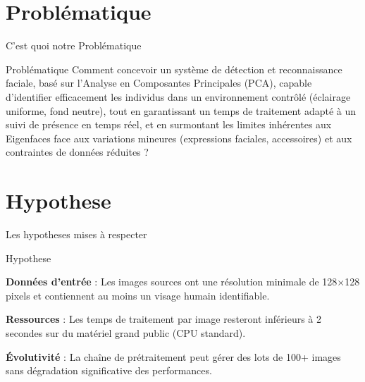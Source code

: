 \documentclass{beamer}
\begin{document}
\section{Problématique}
\begin{frame}{C'est quoi notre Problématique}
    \begin{block}{Problématique}
    Comment concevoir un système de détection et reconnaissance faciale, basé sur l'Analyse en Composantes Principales (PCA), capable d'identifier efficacement les individus dans un environnement contrôlé (éclairage uniforme, fond neutre), tout en garantissant un temps de traitement adapté à un suivi de présence en temps réel, et en surmontant les limites inhérentes aux Eigenfaces face aux variations mineures (expressions faciales, accessoires) et aux contraintes de données réduites ?
    \end{block}
\end{frame}

\section{Hypothese}
\begin{frame}{Les hypotheses mises à respecter}
    \begin{block}{Hypothese}
    \item \textbf{Données d'entrée} : Les images sources ont une résolution minimale de 128×128 pixels et contiennent au moins un visage humain identifiable.
        \item \textbf{Ressources} : Les temps de traitement par image resteront inférieurs à 2 secondes sur du matériel grand public (CPU standard).
        \item \textbf{Évolutivité} : La chaîne de prétraitement peut gérer des lots de 100+ images sans dégradation significative des performances.\\
    \end{block}
\end{frame}
\end{document}
